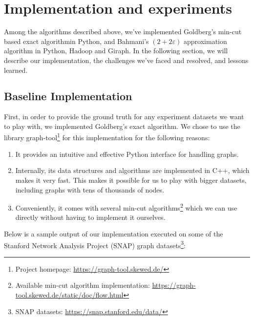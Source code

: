 \documentclass{article}
\begin{document}
\section{Implementation and experiments}
Among the algorithms described above, we've implemented Goldberg's min-cut based exact algorithmin Python, and Bahmani's $(2+2\varepsilon)$ approximation algorithm in Python, Hadoop and Giraph. In the following section, we will describe our implementation, the challenges we've faced and resolved, and lessons learned.

\subsection{Baseline Implementation}
First, in order to provide the ground truth for any experiment datasets we want to play with, we implemented Goldberg's exact algorithm. We chose to use the library graph-tool\footnote{Project homepage: \url{https://graph-tool.skewed.de/}} for this implementation for the following reasons:

\begin{enumerate}
  \item It provides an intuitive and effective Python interface for handling graphs.
  \item Internally, its data structures and algorithms are implemented in C++, which makes it very fast. This makes it possible for us to play with bigger datasets, including graphs with tens of thousands of nodes.
  \item Conveniently, it comes with several min-cut algorithms\footnote{Available min-cut algorithm implementation: \url{https://graph-tool.skewed.de/static/doc/flow.html}} which we can use directly without having to implement it ourselves.
\end{enumerate}

Below is a sample output of our implementation executed on some of the Stanford Network Analysis Project (SNAP) graph datasets\footnote{SNAP datasets: \url{https://snap.stanford.edu/data/}}:
\end{document}
